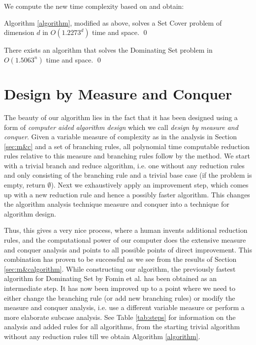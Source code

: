 \documentclass[fleqn]{stacs_proc}
\begin{document}
We compute the new time complexity based on \cite{FominGK07,Robson86} and obtain:
\begin{theorem} \label{thrm:exptime}
Algorithm \ref{algorithm}, modified as above, solves a {\sc Set Cover}
problem of dimension $d$ in $O(1.2273^d)$ time and space.
\qed
\end{theorem}
\begin{corollary}
There exists an algorithm that solves the {\sc Dominating Set} problem in $O(1.5063^n)$ time and space.
\qed
\end{corollary}




\section{Design by Measure and Conquer}
\label{section:design}
The beauty of our algorithm lies in the fact that it has been designed
using a form of {\em computer aided algorithm design} which we call {\em design by measure and conquer}.
Given a variable measure of complexity as in the analysis in Section \ref{sec:m&c}
and a set of branching rules, all polynomial time computable reduction rules
relative to this measure and branching rules follow by the method.
We start with a trivial branch and reduce algorithm, i.e. one without any reduction rules and only
consisting of the branching rule and a trivial base case (if the problem is empty, return $\emptyset$).
Next we exhaustively apply an improvement step,
which comes up with a new reduction rule and hence a possibly faster algorithm.
This changes the algorithm analysis technique measure and conquer into a technique for algorithm design.

Thus, this gives a very nice process, where a human invents 
additional reduction rules, and the computational power of our computer does
the extensive measure and conquer analysis and
points to all possible points of direct improvement.
This combination has proven to be successful
as we see from the results of Section \ref{sec:m&calgorithm}.
While constructing our algorithm, the previously fastest algorithm for {\sc Dominating Set}
by Fomin et al. \cite{FominGK05a} has been obtained as an intermediate step.
It has now been improved up to a point where we need to either
change the branching rule (or add new branching rules) or modify the measure and conquer analysis,
i.e. use a different variable measure or perform a more elaborate subcase analysis.
See Table \ref{tab:steps} for information on the analysis and added rules for
all algorithms, from the starting trivial algorithm without any reduction
rules till we obtain Algorithm \ref{algorithm}.
\end{document}
